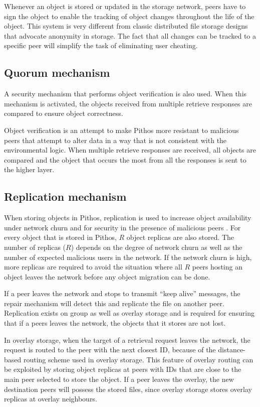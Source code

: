 Whenever an object is stored or updated in the storage network, peers have to sign the object to enable the tracking of object changes throughout the life of the object. This system is very different from classic distributed file storage designs that advocate anonymity in storage. The fact that all changes can be tracked to a specific peer will simplify the task of eliminating user cheating.

\subsection{Quorum mechanism}
\label{quorum}

A security mechanism that performs object verification is also used. When this mechanism is activated, the objects received from multiple retrieve responses are compared to ensure object correctness.

Object verification is an attempt to make Pithos more resistant to malicious peers that attempt to alter data in a way that is not consistent with the environmental logic. When multiple retrieve responses are received, all objects are compared and the object that occurs the most from all the responses is sent to the higher layer.

\subsection{Replication mechanism}

When storing objects in Pithos, replication is used to increase object availability under network churn and for security in the presence of malicious peers \cite{storage_and_chaching_PAST}. For every object that is stored in Pithos, $R$ object replicas are also stored. The number of replicas ($R$) depends on the degree of network churn as well as the number of expected malicious users in the network. If the network churn is high, more replicas are required to avoid the situation where all $R$ peers hosting an object leaves the network before any object migration can be done.

If a peer leaves the network and stops to transmit ``keep alive'' messages, the repair mechanism will detect this and replicate the file on another peer. Replication exists on group as well as overlay storage and is required for ensuring that if a peers leaves the network, the objects that it stores are not lost.

In overlay storage, when the target of a retrieval request leaves the network, the request is routed to the peer with the next closest ID, because of the distance-based routing scheme used in overlay storage. This feature of overlay routing can be exploited by storing object replicas at peers with IDs that are close to the main peer selected to store the object. If a peer leaves the overlay, the new destination peers will possess the stored files, since overlay storage stores overlay replicas at overlay neighbours.

